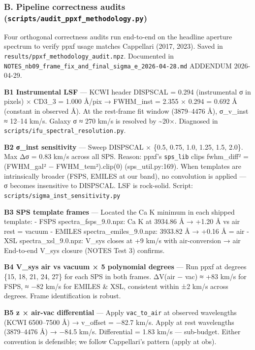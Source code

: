 \documentclass[
  10pt,
]{article}
\begin{document}
\hypertarget{b.-pipeline-correctness-audits-scriptsaudit_ppxf_methodology.py}{%
\subsubsection{\texorpdfstring{B. Pipeline correctness audits
(\texttt{scripts/audit\_ppxf\_methodology.py})}{B. Pipeline correctness audits (scripts/audit\_ppxf\_methodology.py)}}\label{b.-pipeline-correctness-audits-scriptsaudit_ppxf_methodology.py}}

Four orthogonal correctness audits run end-to-end on the headline aperture spectrum to verify ppxf usage matches Cappellari (2017, 2023). Saved in \texttt{results/ppxf\_methodology\_audit.npz}.
Documented in \texttt{NOTES\_nb09\_frame\_fix\_and\_final\_sigma\_e\_2026-04-28.md} ADDENDUM 2026-04-29.

\textbf{B1 Instrumental LSF} --- KCWI header DISPSCAL = 0.294 (instrumental σ in pixels) × CD3\_3 = 1.000 Å/pix → FWHM\_inst = 2.355 × 0.294 = 0.692 Å (constant in observed Å). At the rest-frame fit
window (3879--4476 Å), σ\_v\_inst ≈ 12--14 km/s. Galaxy σ ≈ 270 km/s is resolved by \textasciitilde20×. Diagnosed in \texttt{scripts/ifu\_spectral\_resolution.py}.

\textbf{B2 σ\_inst sensitivity} --- Sweep DISPSCAL × \{0.5, 0.75, 1.0, 1.25, 1.5, 2.0\}. Max \textbar Δσ\textbar{} = 0.83 km/s across all SPS. Reason: ppxf's \texttt{sps\_lib} clips fwhm\_diff² =
(FWHM\_gal² − FWHM\_tem²).clip(0) (sps\_util.py:169). When templates are intrinsically broader (FSPS, EMILES at our band), no convolution is applied --- σ becomes insensitive to DISPSCAL. LSF is
rock-solid. Script: \texttt{scripts/sigma\_inst\_sensitivity.py}

\textbf{B3 SPS template frames} --- Located the Ca K minimum in each shipped template: - FSPS spectra\_fsps\_9.0.npz: Ca K at 3934.86 Å → +1.20 Å vs air rest = vacuum - EMILES
spectra\_emiles\_9.0.npz: 3933.82 Å → +0.16 Å = air - XSL spectra\_xsl\_9.0.npz: V\_sys closes at +9 km/s with air-conversion → air End-to-end V\_sys closure (NOTES Test 3) confirms.

\textbf{B4 V\_sys air vs vacuum × 5 polynomial degrees} --- Run ppxf at degrees \{15, 18, 21, 24, 27\} for each SPS in both frames. ΔV(air − vac) ≈ +83 km/s for FSPS, ≈ −82 km/s for EMILES \& XSL,
consistent within ±2 km/s across degrees. Frame identification is robust.

\textbf{B5 z × air-vac differential} --- Apply \texttt{vac\_to\_air} at observed wavelengths (KCWI 6500--7500 Å) → v\_offset = −82.7 km/s. Apply at rest wavelengths (3879--4476 Å) → −84.5 km/s.
Differential = 1.83 km/s --- sub-budget. Either convention is defensible; we follow Cappellari's pattern (apply at obs).
\end{document}
